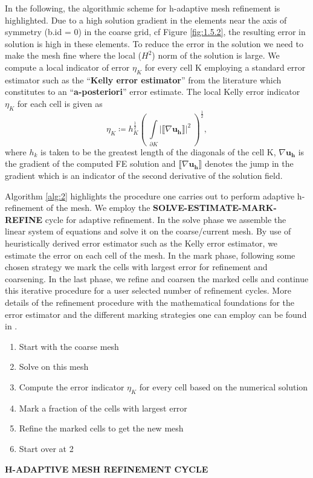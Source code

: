 \documentclass[11pt,a4paper,final]{article}
\newcommand{\seminorm}[1]{\left\lvert #1 \right\rvert}
\begin{document}
In the following, the algorithmic scheme for h-adaptive mesh refinement is highlighted. Due to a high solution gradient in the elements near the axis of symmetry (b.id = 0) in the coarse grid, cf Figure \eqref{fig:1.5.2}, the resulting error in solution is high in these elements. To reduce the error in the solution we need to make the mesh fine where the local ($H^2$) norm of the solution is large. We compute a local indicator of error $\eta_K$ for every cell K employing a standard error estimator such as the ``\textbf{Kelly error estimator}'' from the literature \cite{Kelly1983} which constitutes to an ``\textbf{a-posteriori}'' error estimate. The local Kelly error indicator $\eta_K$ for each cell is given as 
\begin{equation}
\eta_K \coloneqq h_K^{\frac{1}{2}} \left( \ \int\limits_{\partial K} \seminorm{{\llbracket\nabla \mathbf{u_h} \rrbracket}}^2 \ \right)^\frac{1}{2},
\label{eq:1.27}
\end{equation}
where $h_k$ is taken to be the greatest length of the diagonals of the cell K, $\nabla \mathbf{u_h}$ is the gradient of the computed FE solution and $\llbracket\nabla \mathbf{u_h} \rrbracket$ denotes the jump in the gradient which is an indicator of the second derivative of the solution field. \par 

Algorithm \eqref{alg:2} highlights the procedure one carries out to perform adaptive h-refinement of the mesh. We employ the \textbf{SOLVE-ESTIMATE-MARK-REFINE} cycle for adaptive refinement. In the solve phase we assemble the linear system of equations and solve it on the coarse/current mesh. By use of heuristically derived error estimator such as the Kelly error estimator, we estimate the error on each cell of the mesh. In the mark phase, following some chosen strategy we mark the cells with largest error for refinement and coarsening. In the last phase, we refine and coarsen the marked cells and continue this iterative procedure for a user selected number of refinement cycles. More details of the refinement procedure with the mathematical foundations for the error estimator and the different marking strategies one can employ can be found in \cite[Chapter 4]{Gholap_project}. \par 

\begin{algorithm}[h]
\begin{enumerate}
\item Start with the coarse mesh
\item Solve on this mesh
\item Compute the error indicator $\eta_K$ for every cell based on the numerical solution
\item Mark a fraction of the cells with largest error
\item Refine the marked cells to get the new mesh
\item Start over at 2
\end{enumerate}
\caption{\textbf{H-ADAPTIVE MESH REFINEMENT CYCLE}}
\label{alg:2} 
\end{algorithm}
\end{document}
